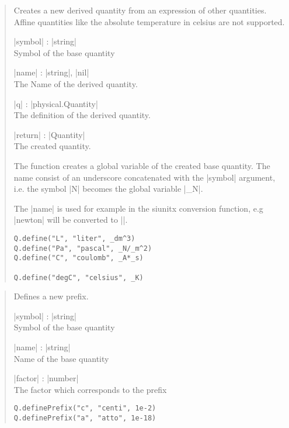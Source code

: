\documentclass{ltxdoc}
\begin{document}
\begin{quote}
  Creates a new derived quantity from an expression of other quantities. Affine quantities like the absolute temperature in celsius are not supported.

  \begin{description}
  \item |symbol| : |string|\\
  Symbol of the base quantity

  \item |name| : |string|, |nil|\\
    The Name of the derived quantity.

  \item |q| : |physical.Quantity|\\
    The definition of the derived quantity.

  \item |return| : |Quantity|\\
    The created quantity.
  \end{description}

  The function creates a global variable of the created base quantity. The name consist of an underscore concatenated with the |symbol| argument, i.e. the symbol |N| becomes the global variable |_N|.

  The |name| is used for example in the siunitx conversion function, e.g |newton| will be converted to |\newton|. 

  \subtitle{Example}
  \begin{lstlisting}
Q.define("L", "liter", _dm^3)
Q.define("Pa", "pascal", _N/_m^2)
Q.define("C", "coulomb", _A*_s)

Q.define("degC", "celsius", _K)
  \end{lstlisting}
\end{quote}




\begin{quote}
  Defines a new prefix.

  \begin{description}
  \item |symbol| : |string|\\
    Symbol of the base quantity

  \item |name| : |string|\\
    Name of the base quantity

  \item |factor| : |number|\\
    The factor which corresponds to the prefix
  \end{description}


\begin{lstlisting}
Q.definePrefix("c", "centi", 1e-2)
Q.definePrefix("a", "atto", 1e-18)
\end{lstlisting}
\end{quote}
\end{document}

